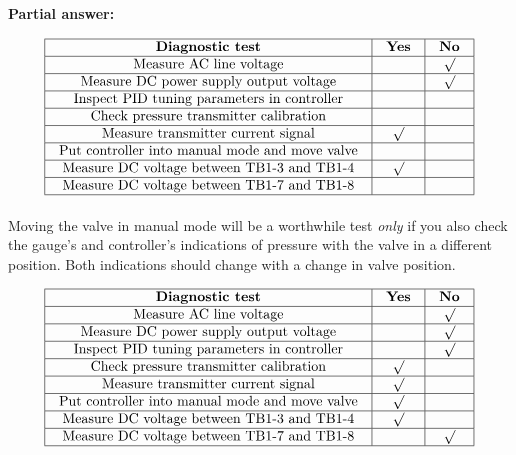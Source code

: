 





\noindent
{\bf Partial answer:}


$$\vbox{\offinterlineskip
\halign{\strut
\vrule \quad\hfil # \ \hfil & 
\vrule \quad\hfil # \ \hfil & 
\vrule \quad\hfil # \ \hfil \vrule \cr
\noalign{\hrule}
%
{\bf Diagnostic test} & {\bf Yes} & {\bf No} \cr
%
\noalign{\hrule}
%
Measure AC line voltage &  & $\surd$ \cr
%
\noalign{\hrule}
%
Measure DC power supply output voltage &  & $\surd$ \cr
%
\noalign{\hrule}
%
Inspect PID tuning parameters in controller &  &  \cr
%
\noalign{\hrule}
%
Check pressure transmitter calibration &  &  \cr
%
\noalign{\hrule}
%
Measure transmitter current signal & $\surd$ &  \cr
%
\noalign{\hrule}
%
Put controller into manual mode and move valve &  &  \cr
%
\noalign{\hrule}
%
Measure DC voltage between TB1-3 and TB1-4 & $\surd$ &  \cr
%
\noalign{\hrule}
%
Measure DC voltage between TB1-7 and TB1-8 &  &  \cr
%
\noalign{\hrule}
} %
}$$ %

Moving the valve in manual mode will be a worthwhile test {\it only} if you also check the gauge's and controller's indications of pressure with the valve in a different position.  Both indications should change with a change in valve position.








$$\vbox{\offinterlineskip
\halign{\strut
\vrule \quad\hfil # \ \hfil & 
\vrule \quad\hfil # \ \hfil & 
\vrule \quad\hfil # \ \hfil \vrule \cr
\noalign{\hrule}
%
{\bf Diagnostic test} & {\bf Yes} & {\bf No} \cr
%
\noalign{\hrule}
%
Measure AC line voltage &  & $\surd$ \cr
%
\noalign{\hrule}
%
Measure DC power supply output voltage &  & $\surd$ \cr
%
\noalign{\hrule}
%
Inspect PID tuning parameters in controller &  & $\surd$ \cr
%
\noalign{\hrule}
%
Check pressure transmitter calibration & $\surd$ &  \cr
%
\noalign{\hrule}
%
Measure transmitter current signal & $\surd$ &  \cr
%
\noalign{\hrule}
%
Put controller into manual mode and move valve & $\surd$ &  \cr
%
\noalign{\hrule}
%
Measure DC voltage between TB1-3 and TB1-4 & $\surd$ &  \cr
%
\noalign{\hrule}
%
Measure DC voltage between TB1-7 and TB1-8 &  & $\surd$ \cr
%
\noalign{\hrule}
} %
}$$ %

